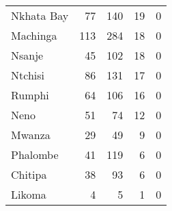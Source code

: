 \begin{tabular}{lrrrr}
Nkhata Bay &             77 &            140 &             19 &              0 \\
Machinga   &            113 &            284 &             18 &              0 \\
Nsanje     &             45 &            102 &             18 &              0 \\
Ntchisi    &             86 &            131 &             17 &              0 \\
Rumphi     &             64 &            106 &             16 &              0 \\
Neno       &             51 &             74 &             12 &              0 \\
Mwanza     &             29 &             49 &              9 &              0 \\
Phalombe   &             41 &            119 &              6 &              0 \\
Chitipa    &             38 &             93 &              6 &              0 \\
Likoma     &              4 &              5 &              1 &              0 \\
\bottomrule
\end{tabular}
